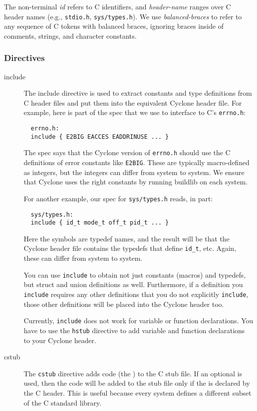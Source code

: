 The non-terminal \hypertarget{id}{\textit{id}} refers
to C identifiers, and \hypertarget{header-name}{\textit{header-name}}
ranges over C header names (e.g., \texttt{stdio.h},
\texttt{sys/types.h}).  We use
\hypertarget{balanced-braces}{\textit{balanced-braces}} to refer to any
sequence of C tokens with balanced braces, ignoring braces inside of
comments, strings, and character constants.

\subsubsection*{Directives}

\begin{description}
\item[include] The include directive is used to extract constants and
type definitions from C header files and put them into the equivalent
Cyclone header file.  For example, here is part of the spec that we
use to interface to C's \texttt{errno.h}:
\begin{verbatim}
  errno.h:
  include { E2BIG EACCES EADDRINUSE ... }
\end{verbatim}
The spec says that the Cyclone version of \texttt{errno.h} should use
the C definitions of error constants like \texttt{E2BIG}.  These are
typically macro-defined as integers, but the integers can differ from
system to system.  We ensure that Cyclone uses the right constants by
running buildlib on each system.

For another example, our spec for \texttt{sys/types.h} reads, in part:
\begin{verbatim}
  sys/types.h:
  include { id_t mode_t off_t pid_t ... }
\end{verbatim}
Here the symbols are typedef names, and the result will be that the
Cyclone header file contains the typedefs that define \texttt{id_t},
etc.  Again, these can differ from system to system.

You can use \texttt{include} to obtain not just constants (macros) and
typedefs, but struct and union definitions as well.  Furthermore, if a
definition you \texttt{include} requires any other definitions that
you do not explicitly \texttt{include}, those other definitions will
be placed into the Cyclone header too.

Currently, \texttt{include} does not work for variable or function
declarations.  You have to use the \texttt{hstub} directive to add
variable and function declarations to your Cyclone header.

\item[cstub]
The \texttt{cstub} directive adds code (the )
to the C stub file.  If an optional  is used, then the code
will be added to the stub file only if the  is declared by the
C header.  This is useful because every system defines a different
subset of the C standard library.


\end{description}
